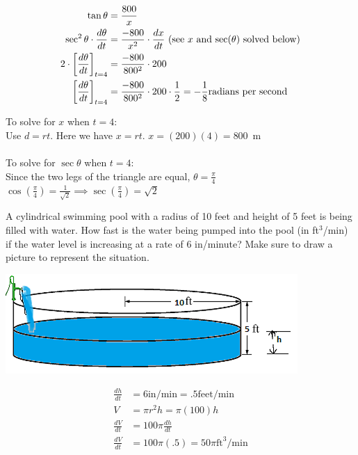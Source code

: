 \documentclass[nooutcomes]{ximera}
\begin{document}
\begin{problem}
\begin{freeResponse}
	\begin{align*}
	\tan {\theta}&=\frac{800}{x}\\
	\sec^2{\theta} \cdot \frac{d\theta}{dt}&=\frac{-800}{x^2}\cdot \frac{dx}{dt}\ \text{(see $x$ and $\sec(\theta)$ solved below)}\\
	2 \cdot \bigg[ \frac{d\theta}{dt} \bigg]_{t=4}&=\frac{-800}{800^2}\cdot 200  \\
	\bigg[ \frac{d\theta}{dt} \bigg]_{t=4}&=\frac{-800}{800^2}\cdot 200 \cdot \frac{1}{2}=-\frac{1}{8} \text{radians per second}
	\end{align*}

To solve for $x$ when $t=4$:\\
Use $d=rt$.  Here we have $x=rt$.  $x=(200)(4)=800$\ m  \\\\

To solve for $\sec{\theta}$ when $t=4$:\\
Since the two legs of the triangle are equal, $\theta=\frac{\pi}{4}$\\
$\cos\left({\frac{\pi}{4}}\right)=\frac{1}{\sqrt{2}} \implies \sec\left({\frac{\pi}{4}}\right)=\sqrt{2}$





\end{freeResponse}
\end{problem}

\begin{problem}
A cylindrical swimming pool with a radius of 10 feet and height of 5 feet is being filled with water.  How fast is the water being pumped into the pool (in ft$^3$/min) if the water level is increasing at a rate of 6 in/minute?  Make sure to draw a picture to represent the situation.
\begin{freeResponse} \hfil
	\begin{image}
	\includegraphics[scale=.7]{Figure18.png}
	\end{image}
	
	
	\begin{align*}
	\frac{dh}{dt}&=6 \text{in/min}=.5 \text{feet/min}\\
	V&=\pi r^2h=\pi(100)h \\
	\frac{dV}{dt}&=100\pi \frac{dh}{dt}\\
	\frac{dV}{dt}&=100 \pi (.5)=50 \pi \text{ft}^3\text{/min}
	\end{align*}


\end{freeResponse}
	
	
\end{problem}
\end{document}
